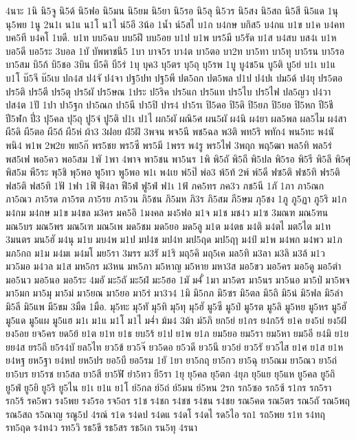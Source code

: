 {4นาะ
1นิ
นิ5จู
นิ5ด้
นิ5ฟอ
นิ5มน
นิ5ยม
นิ5ยา
นิ5รอ
นิ5ลุ
นิ5วร
นิ5สง
นิ5สถ
นิ5สี
นิ5แด
1นุ
นุ5พย
1นู
2น1เ
น1แ
น1โ
น1ไ
น่5อี
3น้อ
1น้ำ
น์5สไ
บ1ก
บ4กษ
บกิส5
บ4กแ
บ1ข
บ1ค
บ4คท
บค5ที
บ4คโ
1บดี.
บ1ท
บบ5ฉบ
บบ5ฝึ
บบ5อย
บ1ป
บ1พ
บร5มี
บ5รัด
บ1ส
บ4สบ
บส4เ
บ1ห
บอ5ดี
บอ5ระ
3บอล
1บั
บัพพาชนี5
1บา
บาจ5ร
บา4ต
บา5ตอ
บา2ท
บา5ทา
บา5ทุ
บา5รน
บา5รอ
บา5สม
บิ5ก้
บิ5ชอ
3บิน
บี5คิ
บี5ร่
1บุ
บุค3
บุ5ตร
บุ5ถุ
บุ5รพ
1บู
บู4ช5น
บู5ติ
บู5ย่
บ1เ
บ1แ
บ1โ
บ๊5จี
บ๊5เบ
ปก4ส
ป4จั
ป4จา
ปฐ5ปท
ปฐ5พี
ปต5ถก
ปต5พล
ป1ป
ป4ปเ
ปม5ด้
ป4ยุ
ปร5ตอ
ปร5ติ
ปร5ตี
ปร5ตุ
ปร5ผั
ปร5ษณ
1ประ
ป5ริค
ปร5แก
ปร5แท
ปร5ไบ
ปร5ไฟ
ปล5ญว
ป4วา
ปส4ต
1ปั
1ปา
ปา5ฐก
ปา5ณก
ปา5นี
ปา5ปิ
ปาร4
ปา5รเ
ปิ5ดอ
ปิ5ดิ
ปิ5ยภ
ปิ5ยอ
ปิ5หก
ปี5ชี
ปี5ฬก
ปี่3
ปุ5คล
ปุ5ถุ
ปู5จ๋
ปู5ติ
ป1เ
ป1ไ
ผก5ผั
ผณิ5ศ
ผน5ผั
ผ4นิ
ผ4ยา
ผล5พล
ผล5ไม
ผ4สา
ผี5ดิ
ผี5ตอ
ผี5ถ้
ผี5ห่
ผ้า3
3ฝอย
ฝ่5ฝั
3พจน
พจ5นี
พช5ฉล
พ3ติ
พท5ริ
พทัก4
พน5ทะ
พ4นั
พนิ4
พ1พ
2พ2ย
พย5ก๊
พร5ชย
พร5ซี
พร5มี
1พรร
พ4รู
พร5ไฟ
3พฤก
พฤ5ฒา
พล5ทิ
พล5ร่
พส5เฟ
พอ5คว
พอ5สม
1พั
1พา
4พาจ
พา5ชน
พา5นร
1พิ
พิ5ถั
พิ5ถี
พิ5ปล
พิ5รอ
พิ5รี
พิ5ลึ
พิ5ศุ
พิส5ม
พี5ระ
พุ5ชิ
พุ5พอ
พู5ทว
พู5พอ
พ1เ
พ4เย
พ่5ป๊
พ่อ3
พ้5ท้
2พ์
พ์5ดี
ฟซ5ติ
ฟซ5ทิ
ฟร5ติ
ฟส5ติ
ฟส5ทิ
1ฟั
1ฟา
1ฟิ
ฟิ4ลา
ฟี5ฟ่
ฟู5ฟ่
ฟ1เ
1ฟ้
ภค5ทร
ภค3ว
ภช5นี
1ภั
1ภา
ภา5ณก
ภา5ณว
ภา5รด
ภา5รต
ภา5รย
ภา5วน
ภิ5ชน
ภิ5มห
ภิ3ร
ภิ5สม
ภี5ษม
ภุ5ชง
1ภู
ภู5ฏา
ภู5ริ
ม1ก
ม4กม
ม4กษ
ม1ข
ม4ขล
ม3คร
มค5อิ
1มงคล
มง5ฟอ
ม1จ
ม1ช
มช4ว
ม1ซ
3มณฑ
มณ5ฑน
มณ5บร
มณ5พร
มณ5เฑ
มณ5เพ
มด5ชม
มด5ยอ
มด5ลู
ม1ต
ม4ตธ
ม4ติ
ม4ตไ
มต5ไต
ม1ท
3มนตร
มน5ฮั
ม4นุ
ม1บ
มบ4พ
ม1ป
มป4ช
มป4ท
มป5ฤด
มป5ฤๅ
ม4ป์
ม1พ
ม4พก
ม4พว
ม1ภ
มภ5กถ
ม1ม
ม4มเ
ม4มโ
มย5รา
3มรร
ม3รั
ม1ริ
มฤ5คิ
มฤ5เค
มล5ทิ
ม3ลา
ม3ลิ
ม3ล้
ม1ว
มว5มอ
ม4วล
ม1ส
มห5กร
ม3หน
มห5ภา
ม5หาญ
ม5หาย
มหา3ส
มอ5ขว
มอ5คร
มอ5ดู
มอ5ตำ
มอ5นว
มอ5นอ
มอ5ระ
4มอั
มะ5ถั
มะ5ฝ่
มะ5ฮอ
1มั
ม4ั่
1มา
มา5ดร
มา5นร
มา5นอ
มา5ป่
มา5พจ
มา5มก
มา5มุ
มา5ม่
มา5ยณ
มา5ยอ
มา5ร่
มา3ว4
1มิ
มิ5กภ
มิ5ซร
มิ5ตล
มิ5ถิ
มิ5น่
มิ5ฟล
มิ5ลำ
มิ5ลี
มิ5แพ
มี5ขม
3มืด
1มือ.
มุ5ทะ
มุ5ทั
มุ5ทิ
มุ5ทุ
มุ5ฮั
มู5ซี
มู5ป่
มู5รต
มู5ลิ
มู5หย
มู5หร
มู5ฮั
มู5แด
มู5แผ
มู5แฮ
ม1เ
ม1แ
ม1โ
ม1ไ
ม4่า
ม้ม4
3ม้า
ม์5ภิ
ยก5ย่
ย1กร
ย4ก5ร้
ย1ค
ยง5บ่
ยง5ฝ้
ยง5อย
ยจ5คร
ยด5ย้
ย1ต
ย1ท
ย1ธ
ยบ5ร้
ย1ป
ย1พ
ย1ภ
ยม5ยอ
ยม5รา
ยม5หา
ยม5อี
ย4มิ
ย1ย
ยย4ส
ยร5ถี
ย5ร4บั
ยล5ไท
ยว5ข้
ยว5จ๊
ยว5ดอ
ย5วดี
ยว5นี
ยว5ย่
ยว5รั
ยว5ไส
ย1ศ
ย1ส
ย1ห
ย4หฐ
ยห5ฐา
ย4หป
ยห5ปร
ยอ5บี
ยอ5รม
1ยั
1ยา
ยา5กฤ
ยา5กว
ยา5ฉุ
ยา5ณม
ยา5ณว
ยา5ถ่
ยา5บร
ยา5รช
ยา5สล
ยา5สี
ยา5ฬั
ยำ5ทว
ยี5รา
1ยุ
ยุ5คล
ยุ5ตก
4ยุภ
ยุ5แย
ยุ5แห
ยู5คล
ยู5ถิ
ยู5ฟ่
ยู5ยิ
ยู5ริ
ยู5ไน
ย1เ
ย1แ
ย1โ
ย์5กล
ย์5ถ่
ย์5มน
ย์5หน
2รก
รก5ซอ
รก5ซ้
ร1กร
รก5รา
รก5ร้
รค5พว
รง5พย
รง5รอ
รจ5ถร
ร1ช
ร4ชก
ร4ชช
ร4ชน
ร4ชย
รณ5คด
รณ5ตร
รณ5ถั
รณ5พฤ
รณ5สถ
ร5ณาญ
รณู5ป
4รณ์
ร1ด
ร4ดป
ร4ดแ
ร4ดโ
ร4ดไ
รด5ไอ
รถ1
รถ5พย
ร1ท
ร4ทฤ
รท5ฤด
ร4ท4ว
รท5วิ
รธ5ขึ
รธ5สร
รธ5เก
รน5ทุ
4รนา
}
